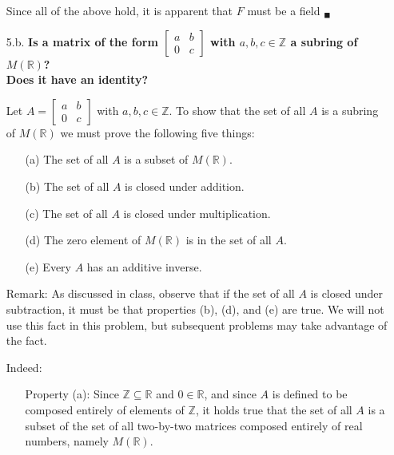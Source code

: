 \documentclass{article}
\begin{document}
\begin{enumerate}
			Since all of the above hold, it is apparent that $F$ must be a field $_{\blacksquare}$

		\item [5.b.] \textbf{Is a matrix of the form $\begin{bmatrix} a & b \\ 0 & c \end{bmatrix}$ 
						with $a, b, c \in \mathbb{Z}$ a subring of $M(\mathbb{R})$? \\
						Does it have an identity?}

			Let $A = \begin{bmatrix} a & b \\ 0 & c \end{bmatrix}$ with $a, b, c \in \mathbb{Z}$. To
			show that the set of all $A$ is a subring of $M(\mathbb{R})$ we must prove the following
			five things:

			\begin{enumerate}
				\item [(a)] The set of all $A$ is a subset of $M(\mathbb{R})$.
				\item [(b)] The set of all $A$ is closed under addition.
				\item [(c)] The set of all $A$ is closed under multiplication.
				\item [(d)] The zero element of $M(\mathbb{R})$ is in the set of all $A$.
				\item [(e)] Every $A$ has an additive inverse.
			\end{enumerate}

			Remark: As discussed in class, observe that if the set of all $A$ is closed under 
			subtraction, it must be that properties (b), (d), and (e) are true. We will not use this
			fact in this problem, but subsequent problems may take advantage of the fact.

			Indeed:

			\begin{enumerate}
				\item [Property (a):] Since $\mathbb{Z} \subseteq \mathbb{R}$ and $0 \in \mathbb{R}$, 
					and since $A$ is defined to be composed entirely of elements of $\mathbb{Z}$, it
					holds true that the set of all $A$ is a subset of the set of all two-by-two 
					matrices composed entirely of real numbers, namely $M(\mathbb{R})$.


\end{enumerate}
\end{enumerate}
\end{document}
